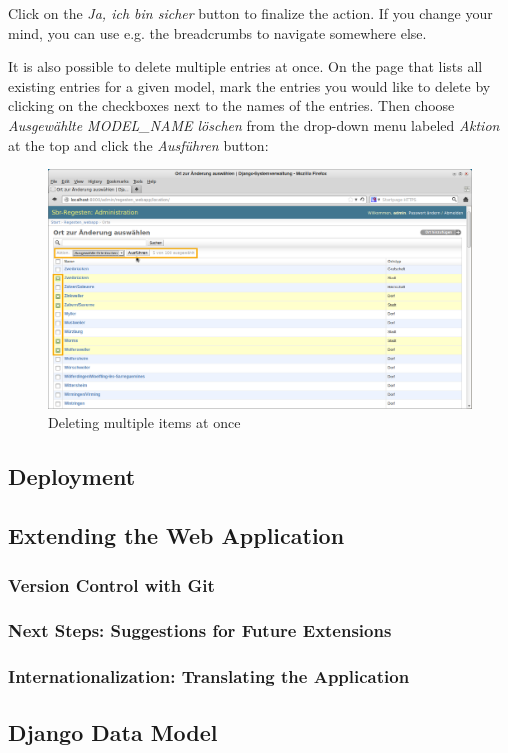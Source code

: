 Click on the \emph{Ja, ich bin sicher} button to finalize the action.
If you change your mind, you can use e.g. the breadcrumbs to navigate
somewhere else.

It is also possible to delete multiple entries at once. On the page
that lists all existing entries for a given model, mark the entries
you would like to delete by clicking on the checkboxes next to the
names of the entries. Then choose \emph{Ausgewählte MODEL\_NAME
  löschen} from the drop-down menu labeled \emph{Aktion} at the top
and click the \emph{Ausführen} button:

\begin{figure}[h]
  \centering
  \includegraphics[scale=0.3]{img/delete-multiple}
  \caption{Deleting multiple items at once}
  \label{fig:delete-multiple}
\end{figure}

\subsection{Deployment}
\label{sec:deploy}

\subsection{Extending the Web Application}
\label{sec:extend}

\subsubsection{Version Control with Git}
\label{sec:git}

\subsubsection{Next Steps: Suggestions for Future Extensions}
\label{sec:next}

\subsubsection{Internationalization: Translating the Application}
\label{sec:translate}

\subsection{Django Data Model}
\label{sec:data-model}
